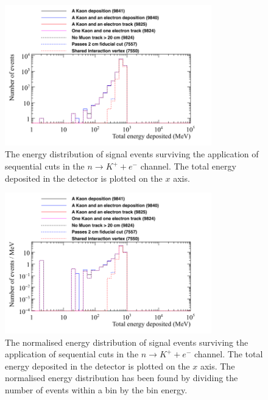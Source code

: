 \begin{figure}[h!]
  \centering
  \includegraphics[width=0.8\textwidth]{NucleonDecay_EnergyDepCuts_Raw_2cmCut}
  \caption[The energy distribution of signal events surviving the application of sequential cuts in the $n \rightarrow K^{+} + e^{-}$ channel]
          {The energy distribution of signal events surviving the application of sequential cuts in the $n \rightarrow K^{+} + e^{-}$ channel. The total energy deposited in the detector is plotted on the $x$ axis.}
  \label{fig:NDK_Sig_Raw}
\end{figure}

\begin{figure}[h!]
  \centering
  \includegraphics[width=0.8\textwidth]{NucleonDecay_EnergyDepCuts_Norm_2cmCut}
  \caption[The normalised energy distribution of signal events surviving the application of sequential cuts in the $n \rightarrow K^{+} + e^{-}$ channel]
          {The normalised energy distribution of signal events surviving the application of sequential cuts in the $n \rightarrow K^{+} + e^{-}$ channel. The total energy deposited in the detector is plotted on the $x$ axis. The normalised energy distribution has been found by dividing the number of events within a bin by the bin energy.}
  \label{fig:NDK_Sig_Norm}
\end{figure}

